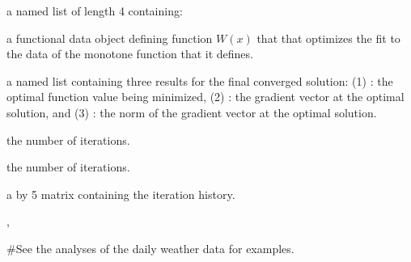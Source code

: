 \begin{Value}
a named list of length 4 containing:

\begin{ldescription}
\item[\code{Wfdobj}] a functional data object defining function $W(x)$ that that
optimizes the fit to the data of the monotone function that it defines.

\item[\code{Flist}] a named list containing three results for the final converged solution:
(1)
: the optimal function value being minimized,
(2)
: the gradient vector at the optimal solution,   and
(3)
: the norm of the gradient vector at the optimal solution.

\item[\code{iternum}] the number of iterations.

\item[\code{iternum}] the number of iterations.

\item[\code{iterhist}] a  by 5 matrix containing the iteration
history.

\end{ldescription}
\end{Value}
\begin{SeeAlso}\relax
{}, 
\end{SeeAlso}
\begin{Examples}
\begin{ExampleCode}
#See the analyses of the daily weather data for examples.
\end{ExampleCode}
\end{Examples}

